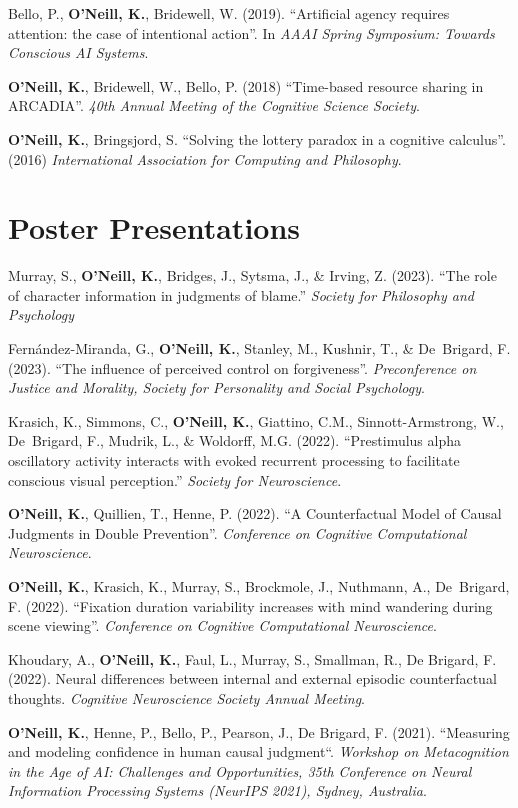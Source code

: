Bello, P., \textbf{O'Neill, K.}, Bridewell, W. (2019). ``Artificial
agency requires attention: the case of intentional action''. In
\emph{AAAI Spring Symposium: Towards Conscious AI Systems}.

\textbf{O'Neill, K.}, Bridewell, W., Bello, P. (2018) ``Time-based
resource sharing in ARCADIA''. \emph{40th Annual Meeting of the
Cognitive Science Society}.

\textbf{O’Neill, K.}, Bringsjord, S. ``Solving the lottery paradox in
a cognitive calculus''. (2016) \emph{International Association for
Computing and Philosophy}.

\line\section{Poster Presentations}

Murray, S., \textbf{O’Neill, K.}, Bridges, J., Sytsma, J., \& Irving,
Z. (2023). ``The role of character information in judgments of
blame.'' \emph{Society for Philosophy and Psychology}

Fern\'{a}ndez-Miranda, G., \textbf{O’Neill, K.}, Stanley, M., Kushnir,
T., \& De~Brigard, F. (2023). ``The influence of perceived control on
forgiveness''. \emph{Preconference on Justice and Morality, Society
for Personality and Social Psychology}.

Krasich, K., Simmons, C., \textbf{O'Neill, K.}, Giattino, C.M.,
Sinnott-Armstrong, W., De~Brigard, F., Mudrik, L., \& Woldorff,
M.G. (2022). ``Prestimulus alpha oscillatory activity interacts with
evoked recurrent processing to facilitate conscious visual
perception.'' \emph{Society for Neuroscience}.

\textbf{O'Neill, K.}, Quillien, T., Henne, P. (2022). ``A
Counterfactual Model of Causal Judgments in Double
Prevention''. \emph{Conference on Cognitive Computational
Neuroscience}.

\textbf{O'Neill, K.}, Krasich, K., Murray, S., Brockmole, J.,
Nuthmann, A., De~Brigard, F. (2022). ``Fixation duration variability
increases with mind wandering during scene viewing''. \emph{Conference
on Cognitive Computational Neuroscience}.

Khoudary, A., \textbf{O’Neill, K.}, Faul, L., Murray, S., Smallman,
R., De Brigard, F. (2022). Neural differences between internal and
external episodic counterfactual thoughts. \emph{Cognitive
Neuroscience Society Annual Meeting}.

\textbf{O'Neill, K.}, Henne, P., Bello, P., Pearson, J., De Brigard,
F. (2021). ``Measuring and modeling confidence in human causal
judgment``. \emph{Workshop on Metacognition in the Age of AI:
Challenges and Opportunities, 35th Conference on Neural Information
Processing Systems (NeurIPS 2021), Sydney, Australia}.

